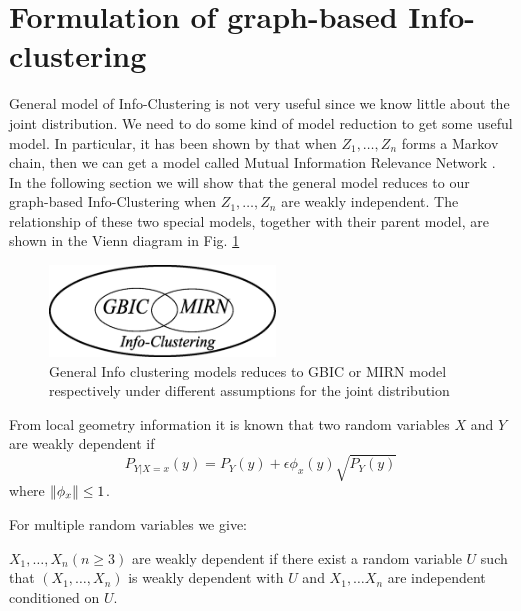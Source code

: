 \section{Formulation of graph-based Info-clustering}\label{sec:GBIC}

General model of Info-Clustering is not very useful since we know little about the joint distribution.
We need to do some kind of model reduction to get some useful model. In particular, it has been shown
by \cite{ic2016} that when $Z_1, \dots, Z_n$ forms a Markov chain, then we can get a model called Mutual Information Relevance Network \citep{butte1999mutual}. In the following section we will show
that the general model reduces to our graph-based Info-Clustering when $Z_1, \dots, Z_n$ are weakly
independent. The relationship of these two special models, together with their parent model, are shown
in the Vienn diagram in Fig. \ref{fig:relationship} %

\begin{figure}
\centering
  \includegraphics[width=6cm]{relationship.eps}
\caption{General Info clustering models reduces to GBIC or MIRN model respectively under different assumptions for the joint distribution}
\label{fig:relationship}       %
\end{figure}

From local geometry information it is known that two random variables $X$ and $Y$ are weakly dependent if
\begin{equation}
P_{Y|X=x}(y) = P_Y(y) +\epsilon \phi_x(y) \sqrt{P_Y(y)}
\end{equation}
where $\lVert\phi_x\rVert\leq 1$.

For multiple random variables we give:

\begin{definition}\label{def:general}
$X_1, \dots, X_n (n\geq 3)$ are weakly dependent if there exist a random variable $U$ such that
$(X_1, \dots, X_n)$ is weakly dependent with $U$ and $X_1, \dots X_n$ are independent conditioned
on $U$.
\end{definition}

